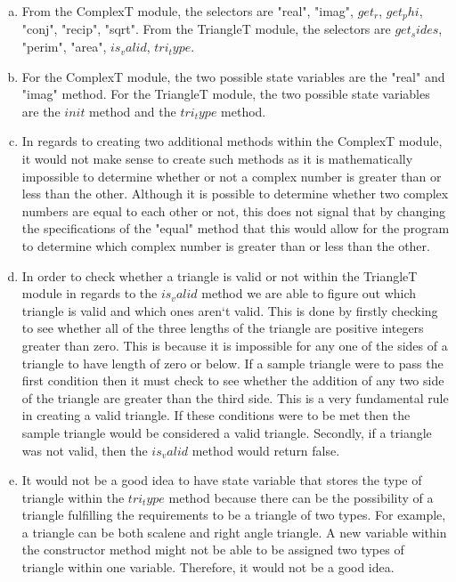 \documentclass[12pt]{article}
\begin{document}
\begin{enumerate}[(a)]

\item From the ComplexT module, the selectors are "real", "imag", $get_r$, $get_phi$, "conj", "recip", "sqrt". From the TriangleT module, the selectors are
$get_sides$, "perim", "area", $is_valid$, $tri_type$.

\item For the ComplexT module, the two possible state variables are the "real" and "imag" method. For the TriangleT module, the two possible state variables
are the $init$ method and the $tri_type$ method.

\item In regards to creating two additional methods within the ComplexT module, it would not make sense to create such methods as it is mathematically
impossible to determine whether or not a complex number is greater than or less than the other. Although it is possible to determine whether two complex
numbers are equal to each other or not, this does not signal that by changing the specifications of the "equal" method that this would allow for the program
to determine which complex number is greater than or less than the other.

\item In order to check whether a triangle is valid or not within the TriangleT module in regards to the $is_valid$ method we are able to figure out which
triangle is valid and which ones aren`t valid. This is done by firstly checking to see whether all of the three lengths of the triangle are positive
integers greater than zero. This is because it is impossible for any one of the sides of a triangle to have length of zero or below. If a sample triangle
were to pass the first condition then it must check to see whether the addition of any two side of the triangle are greater than the third side. This is a
very fundamental rule in creating a valid triangle. If these conditions were to be met then the sample triangle would be considered a valid triangle.
Secondly, if a triangle was not valid, then the $is_valid$ method would return false.

\item It would not be a good idea to have state variable that stores the type of triangle within the $tri_type$ method because there can be the possibility
of a triangle fulfilling the requirements to be a triangle of two types. For example, a triangle can be both scalene and right angle triangle. A new
variable within the constructor method might not be able to be assigned two types of triangle within one variable. Therefore, it would not be a good idea.


\end{enumerate}
\end{document}
